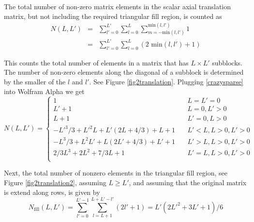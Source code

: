 The total number of non-zero matrix elements in the scalar axial translation matrix, but not including the required triangular fill region, is counted as 
\begin{eqnarray}
N(L,L') &=& \sum_{l' = 0}^{L'} \sum_{l=0}^{L} \sum_{m = -\textrm{min}(l,l')}^{\textrm{min}(l,l')} 1 \label{eq:NLL}\\
\ & = & \sum_{l' = 0}^{L'} \sum_{l=0}^{L} \left( \textrm{2 min}(l,l') + 1 \right) \label{crazysparse}
\end{eqnarray}  

This counts the total number of elements in a matrix that has $L \times L'$ subblocks. The number of non-zero elements along the diagonal of a subblock is determined by the smaller of the $l$ and $l'$. See Figure \ref{fig2translation}.  Plugging \eqref{crazysparse} into Wolfram Alpha we get
\begin{equation}
N(L,L') 
= \left\{
\begin{array}{ccc}
1 & \ & L =  L' = 0 \\
L'+1 &\ & L = 0, L' >0\\
L + 1 & \ & L' = 0 , L>0\\
-L'^3/3+L'^2 L+L' (2 L+4/3)+L+1 & \ & L'<L, L>0,L'>0 \\
-L^3/3+L^2 L'+L (2 L'+4/3)+L'+1 & \ & L'>L, L>0,L'>0 \\
2/3L^3 + 2L^2 + 7/3L + 1 & \ & L' = L, L>0,L'>0 \\
\end{array}
\right.
 \label{eq:a1}
\end{equation}

Next, the total number of nonzero elements in the triangular fill region, see Figure \ref{fig2translation2}, assuming $L \ge L'$, and assuming that the original matrix is extend along rows, is given by 
\begin{equation}
N_{\textrm{fill}}(L,L') = \sum_{l' = 0}^{L'-1} \sum_{l=L+1}^{L + L' - l'} \left( 2 l' + 1 \right) = L'(2L'^2 + 3L' + 1)/6  \label{eq:a2}\end{equation}



